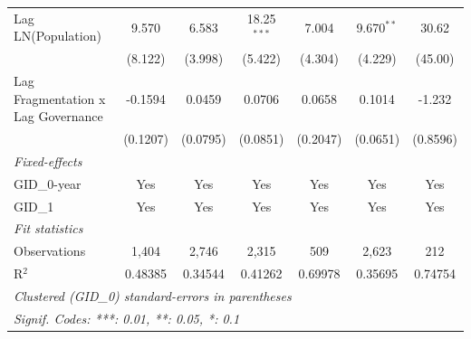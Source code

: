 \begin{table}[H]
\begin{tabular}{lcccccc}
      Lag LN(Population)                 & 9.570    & 6.583          & 18.25$^{***}$ & 7.004        & 9.670$^{**}$   & 30.62\\   
                                         & (8.122)  & (3.998)        & (5.422)       & (4.304)      & (4.229)        & (45.00)\\   
      Lag Fragmentation x Lag Governance & -0.1594  & 0.0459         & 0.0706        & 0.0658       & 0.1014         & -1.232\\   
                                         & (0.1207) & (0.0795)       & (0.0851)      & (0.2047)     & (0.0651)       & (0.8596)\\   
      \midrule
      \emph{Fixed-effects}\\
      GID\_0-year                        & Yes      & Yes            & Yes           & Yes          & Yes            & Yes\\  
      GID\_1                             & Yes      & Yes            & Yes           & Yes          & Yes            & Yes\\  
      \midrule
      \emph{Fit statistics}\\
      Observations                       & 1,404    & 2,746          & 2,315         & 509          & 2,623          & 212\\  
      R$^2$                              & 0.48385  & 0.34544        & 0.41262       & 0.69978      & 0.35695        & 0.74754\\  
      \midrule \midrule
      \multicolumn{7}{l}{\emph{Clustered (GID\_0) standard-errors in parentheses}}\\
      \multicolumn{7}{l}{\emph{Signif. Codes: ***: 0.01, **: 0.05, *: 0.1}}\\
   \end{tabular}
\end{table}



